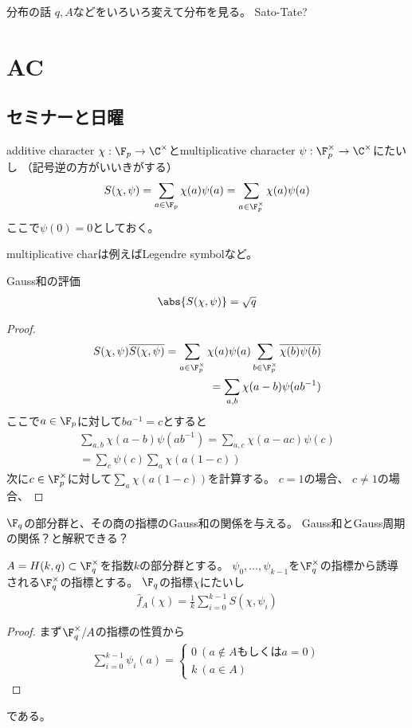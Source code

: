 \documentclass{jsarticle}
\begin{document}
分布の話
$q, A$などをいろいろ変えて分布を見る。
Sato-Tate?

\section{AC}
\subsection{セミナーと日曜}
\begin{dfn}
additive character $\chi:\F_p\to\C^\times$とmultiplicative character $\psi:\F_p^\times\to\C^\times$にたいし
（記号逆の方がいいきがする）
\begin{align*}
S(\chi,\psi)=\sum_{a\in\F_p}\chi(a)\psi(a)=\sum_{a\in\F_p^\times}\chi(a)\psi(a)
\end{align*}
ここで$\psi(0)=0$としておく。
\end{dfn}
multiplicative charは例えばLegendre symbolなど。

\begin{prop}
Gauss和の評価
\begin{align*}
\abs{S(\chi,\psi)}=\sqrt{q}
\end{align*}
\end{prop}
\begin{proof}
\begin{align*}
S(\chi,\psi)\overline{S(\chi,\psi)}=\sum_{a\in\F_p^\times}\chi(a)\psi(a)\sum_{b\in\F_p^\times}\overline{\chi(b)}\overline{\psi(b)}\\
=\sum_{a,b}\chi(a-b)\psi(ab^{-1})
\end{align*}
ここで$a\in\F_p$に対して$ba^{-1}=c$とすると
\begin{align*}
\sum_{a,b}\chi(a-b)\psi(ab^{-1})=\sum_{a,c}\chi(a-ac)\psi(c)\\
=\sum_c\psi(c)\sum_a\chi(a(1-c))
\end{align*}
次に$c\in\F_p^\times$に対して$\sum_a\chi(a(1-c))$を計算する。
$c=1$の場合、
$c\neq1$の場合、
\end{proof}
$\F_q$の部分群と、その商の指標のGauss和の関係を与える。
Gauss和とGauss周期の関係？と解釈できる？
\begin{prop}
$A=H(k,q)\subset \F_q^\times$を指数$k$の部分群とする。
$\psi_0,\ldots,\psi_{k-1}$を$\F_q^\times$の指標から誘導される$\F_q^\times$の指標とする。
$\F_q$の指標$\chi$にたいし
\begin{align*}
\hat{f}_A(\chi)=\frac{1}{k}\sum^{k-1}_{i=0}S(\chi,\psi_i)
\end{align*}
\end{prop}
\begin{proof}
まず$\F_q^\times/A$の指標の性質から
\begin{align*}
\sum_{i=0}^{k-1}\psi_i(a)=\begin{cases}0~(a\not\in A\mbox{もしくは}a=0)\\k~(a\in A)\end{cases}
\end{align*}
\end{proof}
である。
\end{document}

